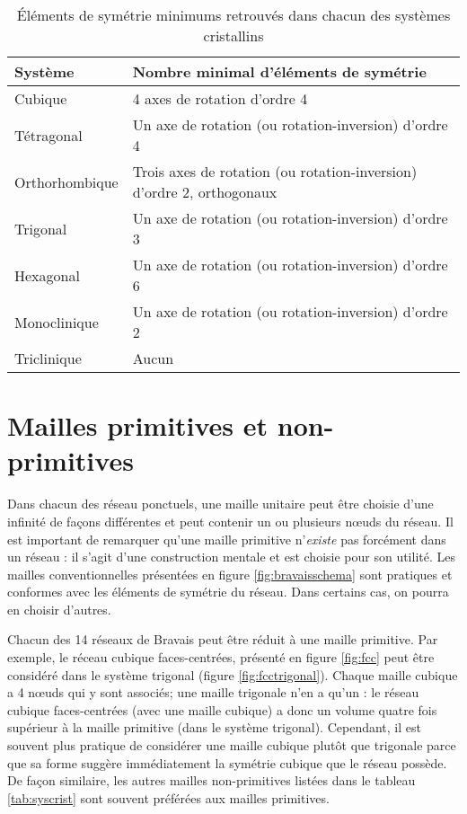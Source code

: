 \begin{table}
    \begin{tabularx}{\textwidth}{lX}
        \toprule
        Système & Nombre minimal d'éléments de symétrie \\
        \midrule
        Cubique & 4 axes de rotation d'ordre 4 \\
        Tétragonal & Un axe de rotation (ou rotation-inversion) d'ordre 4\\
        Orthorhombique & Trois axes de rotation (ou rotation-inversion) d'ordre
        2, orthogonaux \\
        Trigonal & Un axe de rotation (ou rotation-inversion) d'ordre 3 \\
        Hexagonal & Un axe de rotation (ou rotation-inversion) d'ordre 6 \\
        Monoclinique & Un axe de rotation (ou rotation-inversion) d'ordre 2 \\
        Triclinique & Aucun\\
        \bottomrule
    \end{tabularx}
    \label{tab:minsym}
    \caption{Éléments de symétrie minimums retrouvés dans chacun des systèmes
    cristallins}
\end{table}

\section{Mailles primitives et non-primitives}

Dans chacun des réseau ponctuels, une maille unitaire peut être choisie d'une
infinité de façons différentes et peut contenir un ou plusieurs nœuds du réseau.
Il est important de remarquer qu'une maille primitive n'\emph{existe} pas
forcément dans un réseau : il s'agit d'une construction mentale et est choisie
pour son utilité. Les mailles conventionnelles présentées en figure
\ref{fig:bravaisschema} sont pratiques et conformes avec les éléments de symétrie
du réseau. Dans certains cas, on pourra en choisir d'autres.

Chacun des 14 réseaux de Bravais peut être réduit à une maille primitive. Par
exemple, le réceau cubique faces-centrées, présenté en figure \ref{fig:fcc} peut
être considéré dans le système trigonal (figure \ref{fig:fcctrigonal}). Chaque
maille cubique a 4 nœuds qui y sont associés; une maille trigonale n'en a qu'un :
le réseau cubique faces-centrées (avec une maille cubique) a donc un
volume quatre fois supérieur à la maille primitive (dans le système trigonal).
Cependant, il est souvent plus pratique de considérer une maille cubique plutôt
que trigonale parce que sa forme suggère immédiatement la symétrie cubique que le
réseau possède. De façon similaire, les autres mailles non-primitives listées
dans le tableau \ref{tab:syscrist} sont souvent préférées aux mailles primitives.

